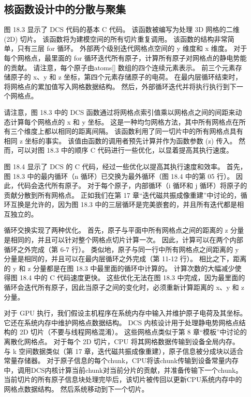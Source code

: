 \subsection{核函数设计中的分散与聚集}
图 18.3 显示了 DCS 代码的基本 C 代码。 该函数被编写为处理 3D 网格的二维 (2D) 切片。 该函数将为建模空间的所有切片重复调用。 该函数的结构非常简单，只有三层 for 循环。 外部两个级别迭代网格点空间的 y 维度和 x 维度。 对于每个网格点，最里面的 for 循环迭代所有原子，计算所有原子对网格点的静电势能的贡献。 请注意，每个原子由atoms[] 数组的四个连续元素表示。 前三个元素存储原子的 x、y 和 z 坐标，第四个元素存储原子的电荷。 在最内层循环结束时，将网格点的累加值写入网格数据结构。 然后，外部循环迭代并将执行执行到下一个网格点。

请注意，图 18.3 中的 DCS 函数通过将网格点索引值乘以网格点之间的间距来动态计算每个网格点的 x 和 y 坐标。 这是一种均匀网格方法，其中所有网格点在所有三个维度上都以相同的距离间隔。 该函数利用了同一切片中的所有网格点具有相同 z 坐标的事实。 该值由函数的调用者预先计算并作为函数参数 (z) 传入。 然而，可以对图 18.3 中的顺序 C 代码进行一些优化，以显着提高其执行速度。

图 18.4 显示了 DCS 的 C 代码，经过一些优化以提高其执行速度和效率。 首先，图 18.3 中的最内循环（n 循环）已交换为最外循环（图 18.4 中的第 05 行）。 因此，代码会迭代所有原子。 对于每个原子，内部循环（i 循环和 j 循环）将原子的贡献分散到所有网格点。 正如我们在第 17 章“迭代磁共振成像重建”中讨论的，循环互换是允许的，因为图 18.3 中的三层循环是完美嵌套的，并且所有迭代都是相互独立的。

循环交换实现了两种优化。 首先，原子与平面中所有网格点之间的距离的 z 分量是相同的，并且可以针对整个网格点切片计算一次。 因此，计算可以在两个内部循环之外完成（第 6-7 行）。 类似地，原子与同一行中所有网格点之间距离的 y 分量是相同的，并且可以在最内层循环之外完成（第 11-12 行）。 相比之下，距离的 y 和 z 分量都是在图 18.3 中最里面的循环中计算的。 计算次数的大幅减少使得图 18.4 中的 C 代码速度更快。 这些优化无法在图 18.3 中完成，因为最里面的循环会迭代所有原子，因此当原子之间的变化时，必须重新计算距离的 x、y 和 z 分量。

对于 GPU 执行，我们假设主机程序在系统内存中输入并维护原子电荷及其坐标。 它还在系统内存中维护网格点数据结构。 DCS 内核设计用于处理静电势网格点结构的 2D 切片（不要与线程网格混淆）。 这些网格点类似于第 8 章“模板”中讨论的离散化网格点。 对于每个 2D 切片，CPU 将其网格数据传输到设备全局内存。 与 k 空间数据类似（第 17 章，迭代磁共振成像重建），原子信息被分成块以适合常量存储器。 对于原子信息的每个chunk，CPU将该chunk传输到设备常量内存中，调用DCS内核计算当前chunk对当前分片的贡献，并准备传输下一个chunk。 当前切片的所有原子信息块处理完毕后，该切片被传回以更新CPU系统内存中的网格点数据结构。 然后系统移动到下一个切片。


